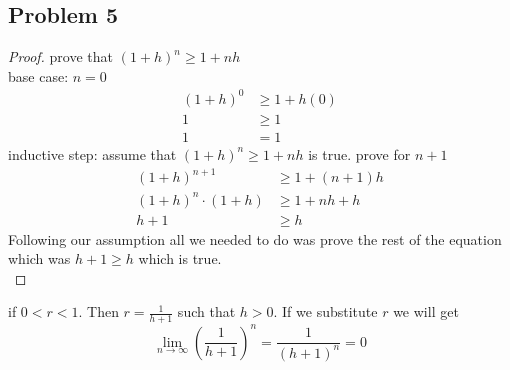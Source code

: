 \documentclass[12pt]{article}
\begin{document}
\subsection*{Problem 5}
\begin{proof}
prove that $(1 + h)^n \geq 1 + nh$ \\
base case: $n = 0$
\begin{align*}
(1 + h)^0 &\geq 1 + h(0) \\
1 &\geq 1 \\
1 &= 1
\end{align*}
inductive step: assume that $(1 + h)^n \geq 1 + nh$ is true. prove for $n + 1$
\begin{align*}
(1 + h)^{n+1} &\geq 1 + (n+1)h \\
(1 + h)^n \cdot (1 + h) &\geq 1 + nh + h \\
h + 1 &\geq h
\end{align*}
Following our assumption all we needed to do was prove the rest of the equation which was $h + 1 \geq h$ which is true.\\
\end{proof}
if $0 < r < 1$. Then $r = \frac{1}{h + 1}$ such that $h > 0$. If we substitute $r$ we will get 
\[ \lim_{n \to \infty} \left( \frac{1}{h+1} \right)^n = \frac{1}{(h + 1)^n} = 0 \]
\end{document}
